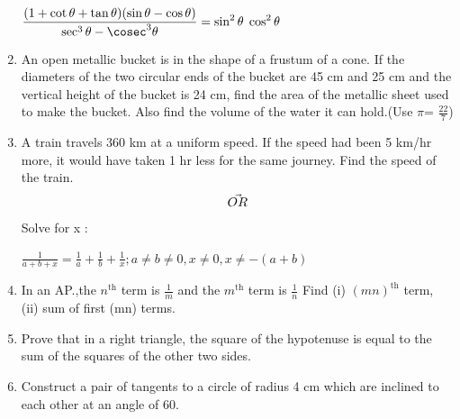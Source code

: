 \documentclass[journal,12pt,twocolumn]{IEEEtran}
\begin{document}
\begin{enumerate}
\begin{center}
 $\displaystyle\frac{(1+\cot\theta+\tan\theta)(\sin\theta-\cos\theta)}{\sec^3\theta-\cosec^3\theta} = \sin^2\theta\; \cos^2\theta$
\end{center}
\item  An open metallic bucket is in the shape of a frustum of a cone. If the diameters of the two circular ends of the bucket are 45 cm and 25 cm and the vertical height of the bucket is 24 cm, find the area of the metallic sheet used to make the bucket. Also find the volume of the water it can hold.(Use $\pi$= $\frac{22}{7}$)
\medskip
\item A train travels 360 km at a uniform speed. If the speed had been 5 km/hr
more, it would have taken 1 hr less for the same journey. Find the speed
of the train.
 \begin{align}
    \centering \vec{OR}\nonumber
\end{align}
Solve for x :
\begin{center}
	$\displaystyle\frac{1}{a+b+x}= \frac{1}{a}+\frac{1}{b}+\frac{1}{x};a\neq b \neq 0,x \neq 0 ,
x\neq -(a+b)$
\end{center}
\item In an AP.,the $n^{\text{th}}$ term is $\displaystyle\frac{1}{m}$ and the $m^{\text{th}}$ term is $\displaystyle\frac{1}{n}$ Find (i) $(mn)^{\text{th}}$ term, (ii) sum of first (mn) terms.
\item Prove that in a right triangle, the square of the hypotenuse is equal to
the sum of the squares of the other two sides.
\medskip
\item Construct a pair of tangents to a circle of radius 4 cm which are inclined
to each other at an angle of 60\textdegree.\\

 \end{enumerate}
\end{document}
